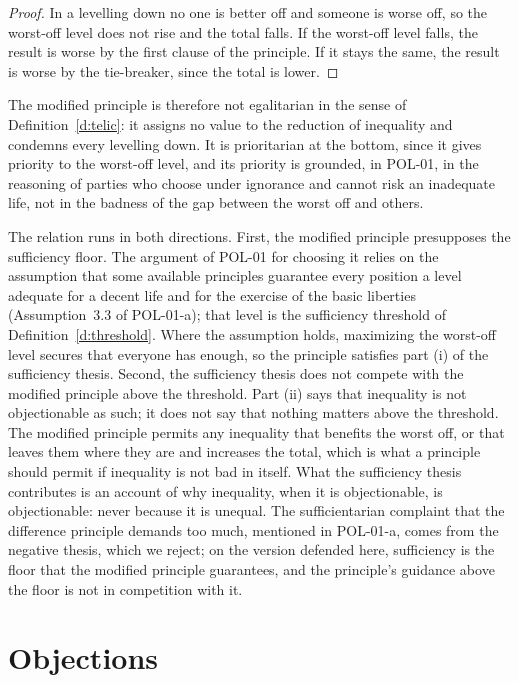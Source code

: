 \documentclass{situationist-preprint}
\begin{document}
\begin{proof}
In a levelling down no one is better off and someone is worse off, so the worst-off level does not rise and the total falls. If the worst-off level falls, the result is worse by the first clause of the principle. If it stays the same, the result is worse by the tie-breaker, since the total is lower.
\end{proof}

The modified principle is therefore not egalitarian in the sense of Definition~\ref{d:telic}: it assigns no value to the reduction of inequality and condemns every levelling down. It is prioritarian at the bottom, since it gives priority to the worst-off level, and its priority is grounded, in POL-01, in the reasoning of parties who choose under ignorance and cannot risk an inadequate life, not in the badness of the gap between the worst off and others.

The relation runs in both directions. First, the modified principle presupposes the sufficiency floor. The argument of POL-01 for choosing it relies on the assumption that some available principles guarantee every position a level adequate for a decent life and for the exercise of the basic liberties (Assumption~3.3 of POL-01-a); that level is the sufficiency threshold of Definition~\ref{d:threshold}. Where the assumption holds, maximizing the worst-off level secures that everyone has enough, so the principle satisfies part (i) of the sufficiency thesis. Second, the sufficiency thesis does not compete with the modified principle above the threshold. Part (ii) says that inequality is not objectionable as such; it does not say that nothing matters above the threshold. The modified principle permits any inequality that benefits the worst off, or that leaves them where they are and increases the total, which is what a principle should permit if inequality is not bad in itself. What the sufficiency thesis contributes is an account of why inequality, when it is objectionable, is objectionable: never because it is unequal. The sufficientarian complaint that the difference principle demands too much, mentioned in POL-01-a, comes from the negative thesis, which we reject; on the version defended here, sufficiency is the floor that the modified principle guarantees, and the principle's guidance above the floor is not in competition with it.

\section{Objections}
\end{document}
